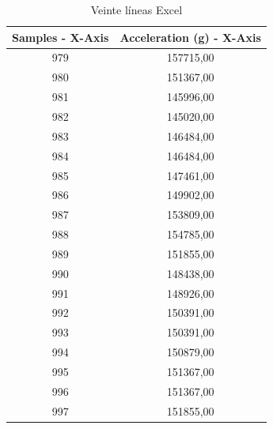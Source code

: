 \documentclass[conference]{IEEEtran}
\begin{document}
    \begin{table}[H]
        \caption{Veinte líneas Excel}
        \begin{center}
            \begin{tabular}{|c|c|}
                \hline
                \textbf{Samples - X-Axis} & \textbf{Acceleration (g) - X-Axis} \\ \hline
                979                       & 157715,00                          \\ \hline
                980                       & 151367,00                          \\ \hline
                981                       & 145996,00                          \\ \hline
                982                       & 145020,00                          \\ \hline
                983                       & 146484,00                          \\ \hline
                984                       & 146484,00                          \\ \hline
                985                       & 147461,00                          \\ \hline
                986                       & 149902,00                          \\ \hline
                987                       & 153809,00                          \\ \hline
                988                       & 154785,00                          \\ \hline
                989                       & 151855,00                          \\ \hline
                990                       & 148438,00                          \\ \hline
                991                       & 148926,00                          \\ \hline
                992                       & 150391,00                          \\ \hline
                993                       & 150391,00                          \\ \hline
                994                       & 150879,00                          \\ \hline
                995                       & 151367,00                          \\ \hline
                996                       & 151367,00                          \\ \hline
                997                       & 151855,00                          \\ \hline
        \end{tabular}
        \end{center}
        \end{table}
\end{document}
